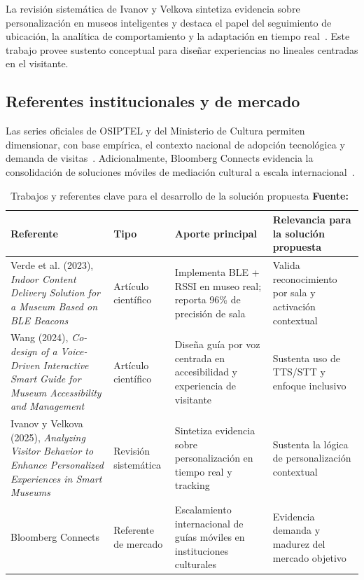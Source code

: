 La revisión sistemática de Ivanov y Velkova sintetiza evidencia sobre personalización en museos inteligentes y destaca el papel del seguimiento de ubicación, la analítica de comportamiento y la adaptación en tiempo real~\cite{ivanov2025smartmuseums}. Este trabajo provee sustento conceptual para diseñar experiencias no lineales centradas en el visitante.

\subsection{Referentes institucionales y de mercado}

Las series oficiales de OSIPTEL y del Ministerio de Cultura permiten dimensionar, con base empírica, el contexto nacional de adopción tecnológica y demanda de visitas~\cite{osiptel2021smartphone,osiptel2022smartphone,osiptel2023smartphone,osiptel2024smartphone,culturapesem2021,cultura2020memoria,cultura2022memoria,cultura2023memoria,cultura2024reporte}. Adicionalmente, Bloomberg Connects evidencia la consolidación de soluciones móviles de mediación cultural a escala internacional~\cite{bloomberg2025connects}.

\vspace{0.5cm}

\begin{table}[h!]
	\centering
	\small
	\setlength{\tabcolsep}{3.5pt}
	\begin{tabular}{>{\raggedright\arraybackslash}p{4.3cm} >{\raggedright\arraybackslash}p{2.5cm} >{\raggedright\arraybackslash}p{3.6cm} >{\raggedright\arraybackslash}p{3.6cm}}
		\hline
		\textbf{Referente} & \textbf{Tipo} & \textbf{Aporte principal} & \textbf{Relevancia para la solución propuesta} \\
		\hline
		Verde et al. (2023), \textit{Indoor Content Delivery Solution for a Museum Based on BLE Beacons} & Artículo científico & Implementa BLE + RSSI en museo real; reporta 96\% de precisión de sala & Valida reconocimiento por sala y activación contextual \\
		Wang (2024), \textit{Co-design of a Voice-Driven Interactive Smart Guide for Museum Accessibility and Management} & Artículo científico & Diseña guía por voz centrada en accesibilidad y experiencia de visitante & Sustenta uso de TTS/STT y enfoque inclusivo \\
		Ivanov y Velkova (2025), \textit{Analyzing Visitor Behavior to Enhance Personalized Experiences in Smart Museums} & Revisión sistemática & Sintetiza evidencia sobre personalización en tiempo real y tracking & Sustenta la lógica de personalización contextual \\
		Bloomberg Connects & Referente de mercado & Escalamiento internacional de guías móviles en instituciones culturales & Evidencia demanda y madurez del mercado objetivo \\
		\hline
	\end{tabular}
	\caption[Trabajos y referentes clave para la solución propuesta]{Trabajos y referentes clave para el desarrollo de la solución propuesta \textbf{Fuente:}~\cite{verde2023blemuseum,wang2024voiceguide,ivanov2025smartmuseums,bloomberg2025connects}}
\end{table}

